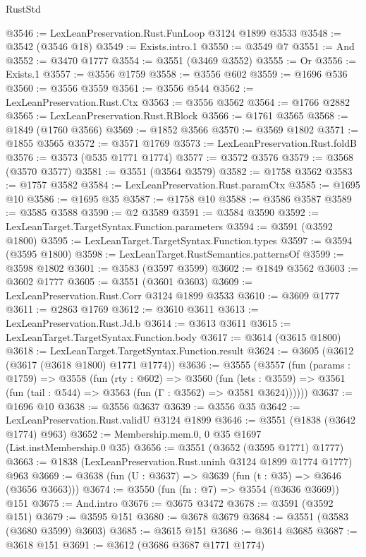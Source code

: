 \begin{lexlean}{RustStd}
\begin{coremodule}
@3546 := LexLeanPreservation.Rust.FunLoop @3124 @1899 @3533
@3548 := @3542 (@3546 @18)
@3549 := Exists.intro.{1}
@3550 := @3549 @7
@3551 := And
@3552 := @3470 @1777
@3554 := @3551 (@3469 @3552)
@3555 := Or
@3556 := Exists.{1}
@3557 := @3556 @1759
@3558 := @3556 @602
@3559 := @1696 @536
@3560 := @3556 @3559
@3561 := @3556 @544
@3562 := LexLeanPreservation.Rust.Ctx
@3563 := @3556 @3562
@3564 := @1766 @2882
@3565 := LexLeanPreservation.Rust.RBlock
@3566 := @1761 @3565
@3568 := @1849 (@1760 @3566)
@3569 := @1852 @3566
@3570 := @3569 @1802
@3571 := @1855 @3565
@3572 := @3571 @1769
@3573 := LexLeanPreservation.Rust.foldB
@3576 := @3573 (@535 @1771 @1774)
@3577 := @3572 @3576
@3579 := @3568 (@3570 @3577)
@3581 := @3551 (@3564 @3579)
@3582 := @1758 @3562
@3583 := @1757 @3582
@3584 := LexLeanPreservation.Rust.paramCtx
@3585 := @1695 @10
@3586 := @1695 @35
@3587 := @1758 @10
@3588 := @3586 @3587
@3589 := @3585 @3588
@3590 := @2 @3589
@3591 := @3584 @3590
@3592 := LexLeanTarget.TargetSyntax.Function.parameters
@3594 := @3591 (@3592 @1800)
@3595 := LexLeanTarget.TargetSyntax.Function.types
@3597 := @3594 (@3595 @1800)
@3598 := LexLeanTarget.RustSemantics.patternsOf
@3599 := @3598 @1802
@3601 := @3583 (@3597 @3599)
@3602 := @1849 @3562
@3603 := @3602 @1777
@3605 := @3551 (@3601 @3603)
@3609 := LexLeanPreservation.Rust.Corr @3124 @1899 @3533
@3610 := @3609 @1777
@3611 := @2863 @1769
@3612 := @3610 @3611
@3613 := LexLeanPreservation.Rust.Jd.b
@3614 := @3613 @3611
@3615 := LexLeanTarget.TargetSyntax.Function.body
@3617 := @3614 (@3615 @1800)
@3618 := LexLeanTarget.TargetSyntax.Function.result
@3624 := @3605 (@3612 (@3617 (@3618 @1800) @1771 @1774))
@3636 := @3555
    (@3557
      (fun (params : @1759) =>
      @3558
        (fun (rty : @602) =>
        @3560
          (fun (lets : @3559) =>
          @3561 (fun (tail : @544) => @3563 (fun (Γ : @3562) => @3581 @3624))))))
@3637 := @1696 @10
@3638 := @3556 @3637
@3639 := @3556 @35
@3642 := LexLeanPreservation.Rust.validU @3124 @1899
@3646 := @3551 (@1838 (@3642 @1774) @963)
@3652 := Membership.mem.{0, 0} @35 @1697 (List.instMembership.{0} @35)
@3656 := @3551 (@3652 (@3595 @1771) @1777)
@3663 := @1838 (LexLeanPreservation.Rust.uninh @3124 @1899 @1774 @1777) @963
@3669 := @3638 (fun (U : @3637) => @3639 (fun (t : @35) => @3646 (@3656 @3663)))
@3674 := @3550 (fun (fn : @7) => @3554 (@3636 @3669)) @151
@3675 := And.intro
@3676 := @3675 @3472
@3678 := @3591 (@3592 @151)
@3679 := @3595 @151
@3680 := @3678 @3679
@3684 := @3551 (@3583 (@3680 @3599) @3603)
@3685 := @3615 @151
@3686 := @3614 @3685
@3687 := @3618 @151
@3691 := @3612 (@3686 @3687 @1771 @1774)

\end{coremodule}
\end{lexlean}
